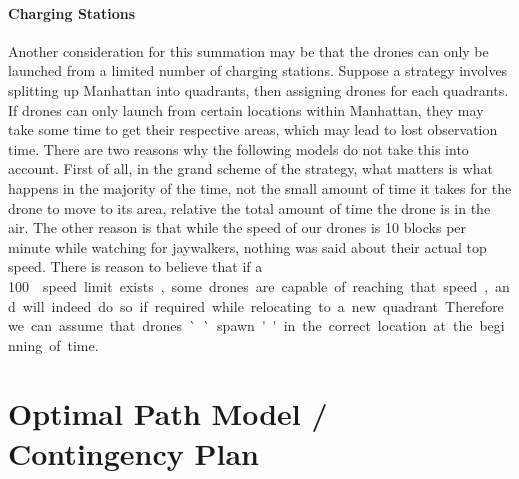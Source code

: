 \documentclass{article}
\begin{document}
\paragraph{Charging Stations}
\label{par:charging_stations}
Another consideration for this summation may be that the drones can only be launched from a limited number of charging stations. Suppose a strategy involves splitting up Manhattan into quadrants, then assigning drones for each quadrants. If drones can only launch from certain locations within Manhattan, they may take some time to get their respective areas, which may lead to lost observation time. There are two reasons why the following models do not take this into account. First of all, in the grand scheme of the strategy, what matters is what happens in the majority of the time, not the small amount of time it takes for the drone to move to its area, relative the total amount of time the drone is in the air. The other reason is that while the speed of our drones is 10 blocks per minute while watching for jaywalkers, nothing was said about their actual top speed. There is reason to believe that if a \SI{100}\mph speed limit exists, some drones are capable of reaching that speed, and will indeed do so if required while relocating to a new quadrant. Therefore we can assume that drones ``spawn'' in the correct location at the beginning of time.

\section{Optimal Path Model / Contingency Plan}
\label{sec:optimal_path_model}
\end{document}
